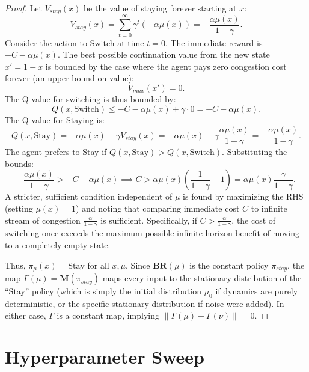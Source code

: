 \documentclass[10pt,twocolumn,letterpaper]{article}
\theoremstyle{definition}
\theoremstyle{remark}
\newcommand{\BR}{\mathbf{BR}}
\begin{document}
{\begin{proof}
    Let $V_{stay}(x)$ be the value of staying forever starting at $x$:
    \[
        V_{stay}(x) = \sum_{t=0}^\infty \gamma^t (-\alpha \mu(x)) = -\frac{\alpha \mu(x)}{1-\gamma}.
    \]
    Consider the action to Switch at time $t=0$. The immediate reward is $-C - \alpha \mu(x)$. The best possible continuation value from the new state $x' = 1-x$ is bounded by the case where the agent pays zero congestion cost forever (an upper bound on value):
    \[
        V_{max}(x') = 0.
    \]
    The Q-value for switching is thus bounded by:
    \[
        Q(x, \text{Switch}) \le -C - \alpha \mu(x) + \gamma \cdot 0 = -C - \alpha \mu(x).
    \]
    The Q-value for Staying is:
    \[
        Q(x, \text{Stay}) = -\alpha \mu(x) + \gamma V_{stay}(x) = -\alpha \mu(x) - \gamma \frac{\alpha \mu(x)}{1-\gamma} = - \frac{\alpha \mu(x)}{1-\gamma}.
    \]
    The agent prefers to Stay if $Q(x, \text{Stay}) > Q(x, \text{Switch})$. Substituting the bounds:
    \[
        - \frac{\alpha \mu(x)}{1-\gamma} > -C - \alpha \mu(x) \implies C > \alpha \mu(x) \left( \frac{1}{1-\gamma} - 1 \right) = \alpha \mu(x) \frac{\gamma}{1-\gamma}.
    \]
    A stricter, sufficient condition independent of $\mu$ is found by maximizing the RHS (setting $\mu(x)=1$) and noting that comparing immediate cost $C$ to infinite stream of congestion $\frac{\alpha}{1-\gamma}$ is sufficient. Specifically, if $C > \frac{\alpha}{1-\gamma}$, the cost of switching once exceeds the maximum possible infinite-horizon benefit of moving to a completely empty state.
    
    Thus, $\pi_\mu(x) = \text{Stay}$ for all $x, \mu$. Since $\BR(\mu)$ is the constant policy $\pi_{stay}$, the map $\Gamma(\mu) = \mathbf{M}(\pi_{stay})$ maps every input to the stationary distribution of the ``Stay'' policy (which is simply the initial distribution $\mu_0$ if dynamics are purely deterministic, or the specific stationary distribution if noise were added). In either case, $\Gamma$ is a constant map, implying $\|\Gamma(\mu) - \Gamma(\nu)\| = 0$.
\end{proof}

}












\section{Hyperparameter Sweep}\label{app: sweep}
\end{document}
